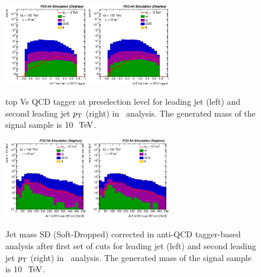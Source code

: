 \begin{figure}[!htb]\centering
\includegraphics[width=0.32\textwidth]{Fig/Zptt/Jet1_thad_vs_QCD_tagger_sel0_nostack_log.eps}
\includegraphics[width=0.32\textwidth]{Fig/Zptt/Jet2_thad_vs_QCD_tagger_sel0_nostack_log.eps}
\caption{top Vs QCD tagger at preselection level for leading jet (left) and second leading jet $p\sb{\scriptstyle\mathrm{T}}$ (right) in \Zptt\ analysis. The generated mass of the signal sample is 10 $\TeV$.}
\label{fig:Zptt_sel0_tagger}
\end{figure}

\begin{figure}[!htb]\centering
\includegraphics[width=0.32\textwidth]{Fig/Zptt/Jet1_trk02_SD_Cor_m_sel3_nostack_log.eps}
\includegraphics[width=0.32\textwidth]{Fig/Zptt/Jet2_trk02_SD_Cor_m_sel3_nostack_log.eps}
\caption{Jet mass SD (Soft-Dropped) corrected in anti-QCD tagger-based analysis after first set of cuts for leading jet (left) and second leading jet $p\sb{\scriptstyle\mathrm{T}}$ (right) in \Zptt\ analysis. The generated mass of the signal sample is 10 $\TeV$.}
\label{fig:Zptt_sel1_tagger}
\end{figure}

